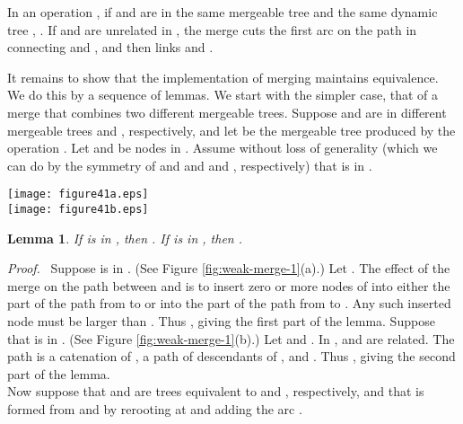 \documentclass[twoside,leqno,twocolumn]{article}
\newtheorem{lemma}{Lemma}
\newcommand{\proof}{\noindent \emph{Proof.}\ }
\newcommand{\proofend}{\\}
\begin{document}
In an operation , if  and  are in the same mergeable tree  and the same dynamic tree ,  .  If  and  are unrelated in , the merge cuts the first arc on the path in  connecting  and , and then links  and .

It remains to show that the implementation of merging maintains equivalence.  We do this by a sequence of lemmas. We start with the simpler case, that of a merge that combines two different mergeable trees.  Suppose  and  are in different mergeable trees  and , respectively, and let  be the mergeable tree produced by the operation .  Let  and  be nodes in .  Assume without loss of generality (which we can do by the symmetry of  and  and  and , respectively) that  is in .



\begin{figure*}[tb]
\begin{center}
\resizebox{1.\textwidth}{!} {\texttt{[image: figure41a.eps]}}\\
\vspace{1cm} \resizebox{1.\textwidth}{!}
{\texttt{[image: figure41b.eps]}}
\end{center}
\caption{\label{fig:weak-merge-1} Proof of Lemma~\ref{lem:weak1}.  Nodes in the tree containing  are black and nodes in the tree containing  are white. Grey nodes can be either black or white depending on the node labels. Solid lines are single arcs; wavy lines are tree paths. (a) Node  is in . Here we assume .  After the merge,  is on  and  is on . (b) Node  is in . Here we assume .  After the merge,  is on  and  is on .}
\end{figure*}


\begin{lemma}
\label{lem:weak1} If  is in , then .  If  is in , then .
\end{lemma}
\proof
Suppose  is in . (See Figure \ref{fig:weak-merge-1}(a).) Let . The effect of the merge on the path between  and  is to insert zero or more nodes of  into either the part of the path from  to  or into the part of the path from  to .  Any such inserted node must be larger than .  Thus , giving the first part of the lemma.  Suppose that  is in . (See Figure \ref{fig:weak-merge-1}(b).) Let  and .  In ,  and  are related.  The path  is a catenation of , a path of descendants of , and .  Thus , giving the second part of the lemma. \proofend

Now suppose that  and  are trees equivalent to  and , respectively, and that  is formed from  and
 by rerooting  at  and adding the arc .
\end{document}
